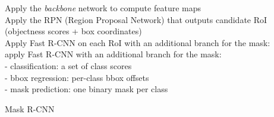 \begin{algorithm}[H]
\DontPrintSemicolon
{}
 Apply the \textit{backbone} network to compute feature maps \\
 Apply the RPN (Region Proposal Network) that outputs candidate RoI (objectness scores + box coordinates) \\
 Apply Fast R-CNN on each RoI with an additional branch for the mask:\\
 {
  apply Fast R-CNN with an additional branch for the mask: \\
 - classification: a set of class scores  \\
 - bbox regression: per-class bbox offsets \\
 - mask prediction: one binary mask per class 
 }
 \caption{Mask R-CNN}
\end{algorithm}

